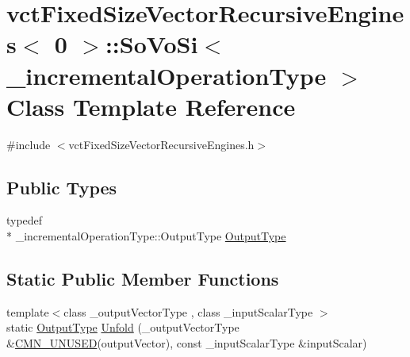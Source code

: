\hypertarget{classvct_fixed_size_vector_recursive_engines_3_010_01_4_1_1_so_vo_si}{\section{vct\-Fixed\-Size\-Vector\-Recursive\-Engines$<$ 0 $>$\-:\-:So\-Vo\-Si$<$ \-\_\-incremental\-Operation\-Type $>$ Class Template Reference}
\label{classvct_fixed_size_vector_recursive_engines_3_010_01_4_1_1_so_vo_si}
}


{\ttfamily \#include $<$vct\-Fixed\-Size\-Vector\-Recursive\-Engines.\-h$>$}

\subsection*{Public Types}
\begin{DoxyCompactItemize}
\item 
typedef \\*
\-\_\-incremental\-Operation\-Type\-::\-Output\-Type \hyperlink{classvct_fixed_size_vector_recursive_engines_3_010_01_4_1_1_so_vo_si_a1481584a05a84187a96256f328b6b587}{Output\-Type}
\end{DoxyCompactItemize}
\subsection*{Static Public Member Functions}
\begin{DoxyCompactItemize}
\item 
{\footnotesize template$<$class \-\_\-output\-Vector\-Type , class \-\_\-input\-Scalar\-Type $>$ }\\static \hyperlink{classvct_fixed_size_vector_recursive_engines_3_010_01_4_1_1_so_vo_si_a1481584a05a84187a96256f328b6b587}{Output\-Type} \hyperlink{classvct_fixed_size_vector_recursive_engines_3_010_01_4_1_1_so_vo_si_a55b43dc32c5c8ddfabc159aad3a8fb87}{Unfold} (\-\_\-output\-Vector\-Type \&\hyperlink{cmn_portability_8h_a021894e2626935fa2305434b1e893ff6}{C\-M\-N\-\_\-\-U\-N\-U\-S\-E\-D}(output\-Vector), const \-\_\-input\-Scalar\-Type \&input\-Scalar)
\end{DoxyCompactItemize}


